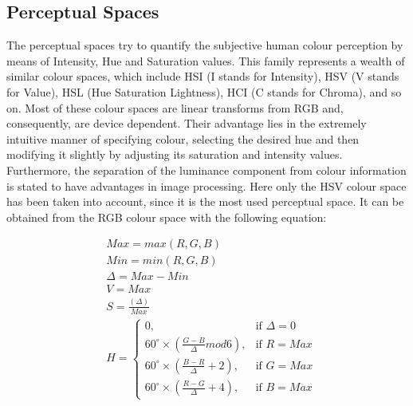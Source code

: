 \documentclass[final,a4paper,12pt,english]{UnicaPhdThesis3}
\begin{document}
\subsection{Perceptual Spaces}  %
The perceptual spaces try to quantify the subjective human colour perception by means of Intensity, Hue and Saturation values. This family represents a wealth of similar colour spaces, which include HSI (I stands for Intensity), HSV (V stands for Value), HSL (Hue Saturation Lightness), HCI (C stands for Chroma), and so on. Most of these colour spaces are linear transforms from RGB and, consequently, are device dependent. Their advantage lies in the extremely intuitive manner of specifying colour, selecting the desired hue and then modifying it slightly by adjusting its saturation and intensity values. Furthermore, the separation of the luminance component from colour information is stated to have advantages in image processing. Here only the HSV colour space has been taken into account, since it is the most used perceptual space. It can be obtained from the RGB colour space with the following equation:

\begin{equation}\label{HSV}
\begin{split}
&Max = max(R, G, B)\\
&Min = min(R, G, B)\\
&\Delta = Max-Min\\
&V = Max\\
&S = \frac{(\Delta)}{Max}\\
&H = \begin{cases} 0, & \mbox{if   } \Delta = 0 \\ 60^\circ \times \left (\frac{G-B}{\Delta} mod6 \right ), & \mbox{if   } R = Max \\  
60^\circ \times \left ( \frac{B-R}{\Delta} + 2 \right ), & \mbox{if   } G = Max\\ 
60^\circ \times \left ( \frac{R-G}{\Delta} + 4 \right ), & \mbox{if   } B = Max\end{cases} 
\end{split}
\end{equation}
\end{document}

